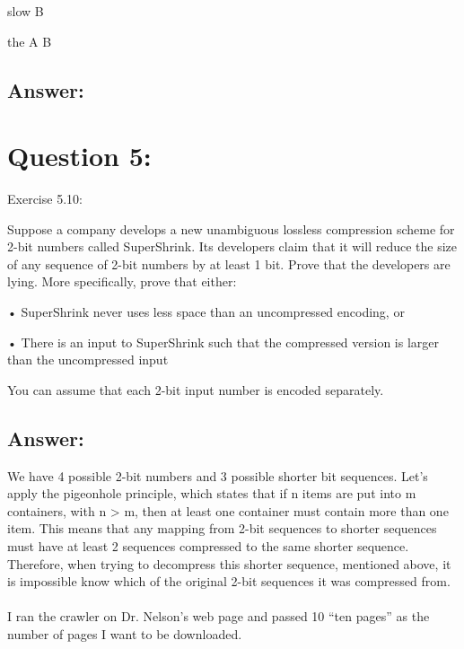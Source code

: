 \documentclass[a4paper, 11pt]{article}
\begin{document}
slow B

the A B

\subsection*{Answer:}

\section*{Question 5:}
Exercise 5.10: 

Suppose a company develops a new unambiguous lossless compression scheme for 2-bit numbers called SuperShrink. Its developers claim that it will reduce the size of any sequence of 2-bit numbers by at least 1 bit. Prove that the developers are lying. More specifically, prove that either:

• SuperShrink never uses less space than an uncompressed encoding, or

• There is an input to SuperShrink such that the compressed version is larger than the uncompressed input

You can assume that each 2-bit input number is encoded separately.

\subsection*{Answer:}

We have 4 possible 2-bit numbers and 3 possible shorter bit sequences. Let's apply the pigeonhole principle, which states that if n items are put into m containers, with n > m, then at least one container must contain more than one item. This means that any mapping from 2-bit sequences to shorter sequences must have at least 2 sequences compressed to the same shorter sequence. Therefore, when trying to decompress this shorter sequence, mentioned above, it is impossible know which of the original 2-bit sequences it was compressed from.

\paragraph{}




I ran the crawler on Dr. Nelson's web page and passed 10 ``ten pages'' as the number of pages I want to be downloaded.
\end{document}
